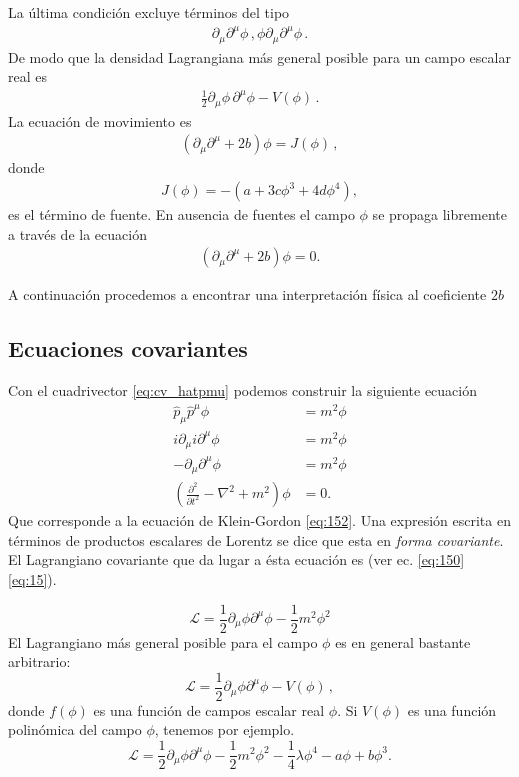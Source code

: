 La última condición excluye términos del tipo
\begin{align}
  \partial_\mu \partial^\mu \phi\,,   \phi\partial_\mu \partial^\mu \phi\,.
\end{align}
De modo que la densidad Lagrangiana más general posible para un campo escalar real es
\begin{align}
  \frac{1}{2}{\partial_\mu\phi}\,{\partial^\mu\phi}-V(\phi)\,.
\end{align}
La ecuación de movimiento es
\begin{align}
  \left( \partial_\mu \partial^{\mu} +2b \right)\phi= J(\phi)\,,
\end{align}
donde
\begin{align}
  J(\phi)=- \left( a + 3c\phi^3 + 4d\phi^4 \right),
\end{align}
es el término de fuente. En ausencia de fuentes el campo $\phi$ se propaga libremente a través de la ecuación
\begin{align}
  \left( \partial_\mu \partial^{\mu} +2b \right)\phi= 0.
\end{align}

A continuación procedemos a encontrar una interpretación física al coeficiente $2b$
\subsection{Ecuaciones covariantes}
\label{sec:ecuac-covar}


Con el cuadrivector \eqref{eq:cv_hatpmu} podemos construir la
siguiente ecuaci\'on
\begin{align}
  \hat{p}_\mu\hat{p}^\mu\phi&=m^2\phi\nonumber\\
  i\partial_\mu i\partial^\mu\phi&=m^2\phi\nonumber\\
  -\partial_\mu\partial^\mu\phi&=m^2\phi\nonumber\\
  \label{eq:waveec}
  \left(\frac{\partial^2}{\partial t^2}-\nabla^2+m^2\right)\phi&=0.
\end{align}
Que corresponde a la ecuaci\'on de Klein-Gordon \eqref{eq:152}. Una expresi\'on escrita en t\'erminos de productos escalares de Lorentz se dice que esta en \emph{forma covariante}. El Lagrangiano covariante que da lugar a
\'esta ecuaci\'on es (ver ec. \eqref{eq:150}
\eqref{eq:15}). %

\begin{equation}
  \label{eq:wavelagtrue}
  \mathcal{L}=\frac{1}{2}\partial_\mu\phi\partial^\mu\phi-\frac{1}{2}m^2\phi^2
\end{equation}
El Lagrangiano m\'as general posible para el campo $\phi$ es en general bastante arbitrario:
\begin{equation}
  \mathcal{L}=\frac{1}{2}\partial_\mu\phi\partial^\mu\phi-V(\phi)\,,
\end{equation}
donde $f(\phi)$ es una función de campos escalar real $\phi$. Si $V(\phi)$ es una función polinómica del campo $\phi$, tenemos por ejemplo.
\begin{equation}
  \label{eq:wavelag}
  \mathcal{L}=\frac{1}{2}\partial_\mu\phi\partial^\mu\phi-\frac{1}{2}m^2\phi^2-\frac{1}{4}\lambda\phi^4-a\phi+b\phi^3.
\end{equation}

